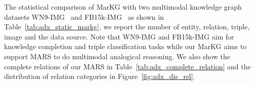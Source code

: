 \documentclass{article} \usepackage{iclr2023_conference,times}
\newcommand{\data}{MARS}
\newcommand{\kg}{MarKG}
\begin{document}
The statistical comparison of {\kg} with two multimodal knowledge graph datasets WN9-IMG~\citep{IKRL} and FB15k-IMG~\citep{MMKG} as shown in Table~\ref{tab:adx_static_markg}, we report the number of entity, relation, triple, image and the data source. Note that WN9-IMG and FB15k-IMG aim for knowledge completion and triple classification tasks while our {\kg} aims to support {\data} to do multimodal analogical reasoning. We also show the complete relations of our {\data} in Table~\ref{tab:adx_complete_relation} and the distribution of relation categories in Figure~\ref{fig:adx_dis_rel}.

\begin{table*}[!htp]
\centering
\small
{}
\end{table*}
\end{document}
